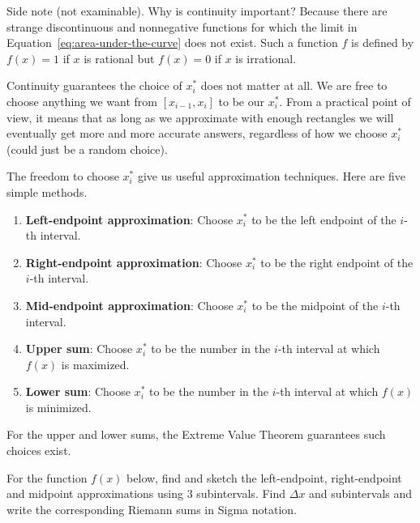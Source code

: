 \documentclass[../main.tex]{subfiles}
\begin{document}
  Side note (not examinable). Why is continuity important? Because there are strange discontinuous and nonnegative functions for which the limit in Equation~\eqref{eq:area-under-the-curve} does not exist.  Such a function \(f\) is defined by \(f(x) = 1\) if \(x\) is rational but \(f(x) = 0\) if \(x\) is irrational. 
 
  \clearpage
  Continuity guarantees the choice of \(x_{i}^{*}\) does not matter at all. We are free to choose anything we want from \([x_{i-1}, x_{i}]\) to be our \(x_{i}^{*}\). From a practical point of view, it means that as long as we approximate with enough rectangles we will eventually get more and more accurate answers, regardless of how we choose \(x_{i}^{*}\) (could just be a random choice).

  The freedom to choose \(x_{i}^{*}\) give us useful approximation techniques. Here are five simple methods.
  \begin{enumerate}
    \item \textbf{Left-endpoint approximation}: Choose \(x_{i}^{*}\) to be the left endpoint of the \(i\)-th interval.
    \item \textbf{Right-endpoint approximation}: Choose \(x_{i}^{*}\) to be the right endpoint of the \(i\)-th interval.
    \item \textbf{Mid-endpoint approximation}: Choose \(x_{i}^{*}\) to be the midpoint of the \(i\)-th interval.
    \item \textbf{Upper sum}: Choose \(x_{i}^{*}\) to be the number in the \(i\)-th interval at which \(f(x)\) is maximized.
    \item \textbf{Lower sum}: Choose \(x_{i}^{*}\) to be the number in the \(i\)-th interval at which \(f(x)\) is minimized.
  \end{enumerate}
  For the upper and lower sums, the Extreme Value Theorem guarantees such choices exist.

  \begin{example}
    For the function \(f(x)\) below, find and sketch the left-endpoint, right-endpoint and midpoint approximations using \(3\) subintervals. Find \(\Delta x\) and subintervals and write the corresponding Riemann sums in Sigma notation.

    \hfill{}
    
    \hfill{}
    
    \hfill{}
    
    \hfill{}

  \end{example}
  \clearpage
\end{document}
